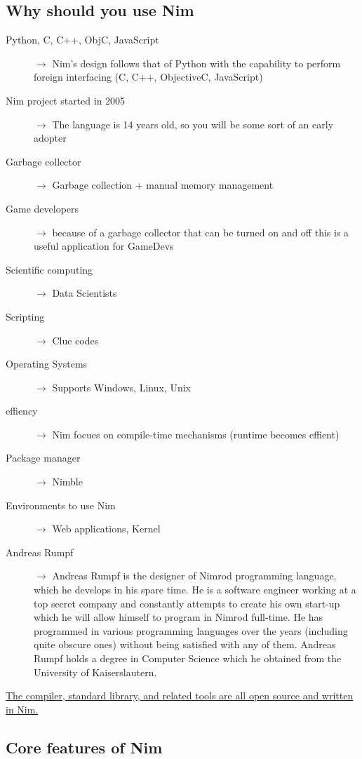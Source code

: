 \documentclass[10pt, a4paper, twocolumn]{article} %
\begin{document}
\newpage
\subsection{Why should you use Nim}
\begin{description}
	\item[Python, C, C++, ObjC, JavaScript] $\longrightarrow$ Nim's design follows that of Python with the capability to perform foreign interfacing (C, C++, ObjectiveC, JavaScript)
	\item[Nim project started in 2005] $\longrightarrow$  The language is 14 years old, so you will be some sort of an early adopter
	\item[Garbage collector] $\longrightarrow$  Garbage collection + manual memory management
	\item[Game developers] $\longrightarrow$  because of a garbage collector that can be turned on and off this is a useful application for GameDevs
	\item[Scientific computing] $\longrightarrow$  Data Scientists
	\item[Scripting] $\longrightarrow$  Clue codes
	\item[Operating Systems] $\longrightarrow$  Supports Windows, Linux, Unix
	\item[effiency] $\longrightarrow$  Nim focues on compile-time mechanisms (runtime becomes effient)
	\item[Package manager] $\longrightarrow$   Nimble
	\item[Environments to use Nim] $\longrightarrow$  Web applications, Kernel
	\item[Andreas Rumpf] $\longrightarrow$  Andreas Rumpf is the designer of Nimrod programming language, which he develops in his spare time. He is a software engineer working at a top secret company and constantly attempts to create his own start-up which he will allow himself to program in Nimrod full-time. He has programmed in various programming languages over the years (including quite obscure ones) without being satisfied with any of them. Andreas Rumpf holds a degree in Computer Science which he obtained from the University of Kaiserslautern.
\end{description}

\href{https://github.com/nim-lang/Nim#contributing}{The compiler, standard library, and related tools are all open source and written in Nim.}

\subsection{Core features of Nim}
\end{document}
